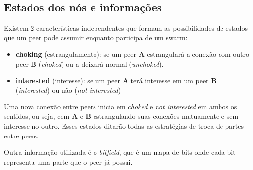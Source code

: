 
\subsection*{Estados dos nós e informações}

Existem 2 características independentes que formam as possibilidades de estados que um
\gls*{peer} pode assumir enquanto participa de um \gls*{swarm}:

\begin{itemize}
    \item \textbf{choking} (estrangulamento): se um \gls*{peer} \textbf{A} estrangulará
        a conexão com outro \gls*{peer} \textbf{B} (\emph{choked}) ou a deixará normal
        (\emph{unchoked}).

    \item \textbf{interested} (interesse): se um \gls*{peer} \textbf{A} terá interesse
        em um \gls*{peer} \textbf{B} (\emph{interested}) ou não (\emph{not interested})
\end{itemize}

Uma nova conexão entre \glspl*{peer} inicia em \emph{choked} e \emph{not interested} em
ambos os sentidos, ou seja, com \textbf{A} e \textbf{B} estrangulando suas conexões
mutuamente e sem interesse no outro. Esses estados ditarão todas as estratégias de troca
de partes entre \glspl*{peer}.

Outra informação utilizada é o \emph{bitfield}, que é um mapa de bits onde cada bit
representa uma parte que o \gls*{peer} já possui.